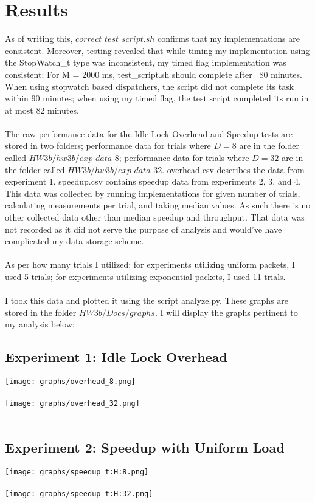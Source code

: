 \documentclass[]{article}
\begin{document}
\section{Results}
As of writing this, $correct\_test\_script.sh$ confirms that my implementations are consistent. Moreover, testing revealed that while timing my implementation using the StopWatch\_t type was inconsistent, my timed flag implementation was consistent; For M = 2000 ms, test\_script.sh should complete after ~80 minutes. When using stopwatch based dispatchers, the script did not complete its task within 90 minutes; when using my timed flag, the test script completed its run in at most 82 minutes.
\\\\
The raw performance data for the Idle Lock Overhead and Speedup tests are stored in two folders; performance data for trials where $D = 8$ are in the folder called $HW3b/hw3b/exp\_data\_8$; performance data for trials where $D = 32$ are in the folder called $HW3b/hw3b/exp\_data\_32$. overhead.csv describes the data from experiment 1. speedup.csv contains speedup data from experiments 2, 3, and 4.
\\
This data was collected by running implementations for given number of trials, calculating measurements per trial, and taking median values. As such there is no other collected data other than median speedup and throughput. That data was not recorded as it did not serve the purpose of analysis and would've have complicated my data storage scheme.
\\\\
As per how many trials I utilized; for experiments utilizing uniform packets, I used 5 trials; for experiments utilizing exponential packets, I used 11 trials.
\\\\
I took this data and plotted it using the script analyze.py. These graphs are stored in the folder $HW3b/Docs/graphs$. I will display the graphs pertinent to my analysis below:
\subsection{Experiment 1: Idle Lock Overhead}
\texttt{[image: graphs/overhead\_8.png]}\\\\
\texttt{[image: graphs/overhead\_32.png]}\\\\
\subsection{Experiment 2: Speedup with Uniform Load}
\texttt{[image: graphs/speedup\_t:H:8.png]}\\\\
\texttt{[image: graphs/speedup\_t:H:32.png]}\\\\
\end{document}
